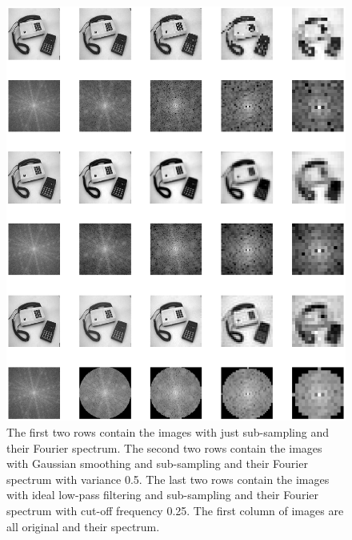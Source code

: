 \documentclass[11pt,a4paper]{article}
\begin{document}
\begin{itemize}
	\begin{figure}[!ht]
		\footnotesize
		\centering 
		\includegraphics[width=\columnwidth]{Smoothing_Subsampling_Gauss_0_5_Lowpass_0_25.eps}
		\caption{The first two rows contain the images with just sub-sampling and their Fourier spectrum. The second two rows contain the images with Gaussian smoothing and sub-sampling and their Fourier spectrum with variance 0.5. The last two rows contain the images with ideal low-pass filtering and sub-sampling and their Fourier spectrum with cut-off frequency 0.25. The first column of images are all original and their spectrum.}
		\label{fig:smoothingSampling}
	\end{figure}
\end{itemize}

% 
\end{document}
